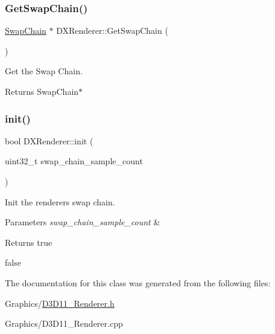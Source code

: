 \subsubsection{\texorpdfstring{Get\+Swap\+Chain()}{GetSwapChain()}\hspace{0.1cm}{\footnotesize\ttfamily [2/2]}}
{\footnotesize\ttfamily \hyperlink{structSwapChain}{Swap\+Chain} $\ast$ D\+X\+Renderer\+::\+Get\+Swap\+Chain (\begin{DoxyParamCaption}{ }\end{DoxyParamCaption})}



Get the Swap Chain. 

\begin{DoxyReturn}{Returns}
Swap\+Chain$\ast$ 
\end{DoxyReturn}
\mbox{\label{classDXRenderer_a3ac6805cd3b999b5a8546c36e0cb7e2c}} 
\subsubsection{\texorpdfstring{init()}{init()}}
{\footnotesize\ttfamily bool D\+X\+Renderer\+::init (\begin{DoxyParamCaption}\item[{uint32\+\_\+t}]{swap\+\_\+chain\+\_\+sample\+\_\+count }\end{DoxyParamCaption})}



Init the renderer\textquotesingle{}s swap chain. 


\begin{DoxyParams}{Parameters}
{\em swap\+\_\+chain\+\_\+sample\+\_\+count} & \\
\hline
\end{DoxyParams}
\begin{DoxyReturn}{Returns}
true 

false 
\end{DoxyReturn}


The documentation for this class was generated from the following files\+:\begin{DoxyCompactItemize}
\item 
Graphics/\hyperlink{D3D11__Renderer_8h}{D3\+D11\+\_\+\+Renderer.\+h}\item 
Graphics/D3\+D11\+\_\+\+Renderer.\+cpp\end{DoxyCompactItemize}
